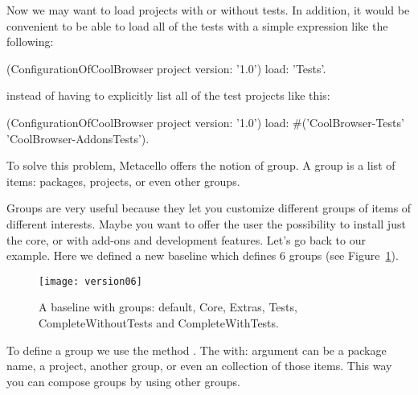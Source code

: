 \documentclass[a4paper,10pt,twoside]{book}
\begin{document}
Now we may want to load projects with or without tests. In addition, it would be convenient to be able to load all of the tests with a simple expression like the following:

\begin{code}{}
(ConfigurationOfCoolBrowser project version: '1.0') load: 'Tests'.
\end{code}

instead of having to explicitly list all of the test projects like this:
 
\begin{code}{} 
(ConfigurationOfCoolBrowser project version: '1.0') 
       load: #('CoolBrowser-Tests' 'CoolBrowser-AddonsTests').
\end{code}
 
To solve this problem, Metacello offers the notion of group. A group is a list of items: packages, projects, or even other groups. 
 
Groups are very useful because they let you customize different groups of items of different interests. Maybe you want to offer the  user the possibility to install just the core, or with add-ons and development features. Let's go back to our example. Here we defined a new baseline  which defines 6 groups (see Figure~\ref{fig:version06}). 

\begin{figure}
\begin{center}
\texttt{[image: version06]}
\caption{A baseline with groups: default, Core, Extras, Tests, CompleteWithoutTests and CompleteWithTests.\label{fig:version06}}
\end{center}
\end{figure} 


To define a group we use the method . The {with:} argument can be a package name, a project, another group, or even an collection of those items. This way you can compose groups by using other groups. 
 
\end{document}
